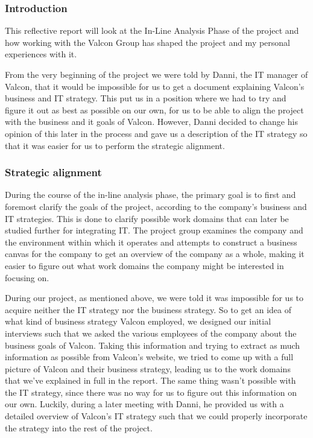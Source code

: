 \subsubsection{Introduction}
This reflective report will look at the In-Line Analysis Phase of the project and how working with the Valcon Group has shaped the project and my personal experiences with it.

From the very beginning of the project we were told by Danni, the IT manager of Valcon, that it would be impossible for us to get a document explaining Valcon’s business and IT strategy. This put us in a position where we had to try and figure it out as best as possible on our own, for us to be able to align the project with the business and it goals of Valcon.
However, Danni decided to change his opinion of this later in the process and gave us a description of the IT strategy so that it was easier for us to perform the strategic alignment.

\subsubsection{Strategic alignment}
During the course of the in-line analysis phase, the primary goal  is to first and foremost clarify the goals of the project, according to the company’s business and IT strategies. This is done to clarify possible work domains that can later be studied further for integrating IT. The project group examines the company and the environment within which it operates and attempts to construct a business canvas for the company to get an overview of the company as a whole, making it easier to figure out what work domains the company might be interested in focusing on.

During our project, as mentioned above, we were told it was impossible for us to acquire neither the IT strategy nor the business strategy. So to get an idea of what kind of business strategy Valcon employed, we designed our initial interviews such that we asked the various employees of the company about the business goals of Valcon. Taking this information and trying to extract as much information as possible from Valcon’s website, we tried to come up with a full picture of Valcon and their business strategy, leading us to the work domains that we’ve explained in full in the report.
The same thing wasn’t possible with the IT strategy, since there was no way for us to figure out this information on our own. Luckily, during a later meeting with Danni, he provided us with a detailed overview of Valcon’s IT strategy such that we could properly incorporate the strategy into the rest of the project.

